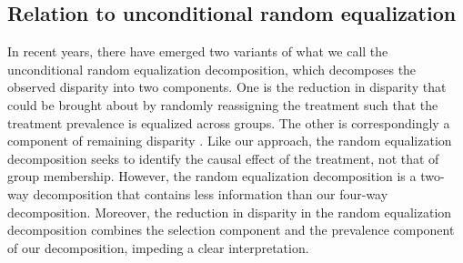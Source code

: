 \documentclass[12pt,a4paper]{article}
\begin{document}
\subsection{Relation to unconditional random equalization}
In recent years, there have emerged two variants of what we call the unconditional random equalization decomposition, which decomposes the observed disparity into two components. One is the reduction in disparity that could be brought about by randomly reassigning the treatment such that the treatment prevalence is equalized across groups. The other is correspondingly a component of remaining disparity \citep{vanderweele_causal_2014, jackson_decomposition_2018, sudharsanan_educational_2021, lundberg_gap-closing_2022,park_sensitivity_2023}. Like our approach, the random equalization decomposition seeks to identify the causal effect of the treatment, not that of group membership. However, the random equalization decomposition is a two-way decomposition that contains less information than our four-way decomposition. Moreover, the reduction in disparity in the random equalization decomposition combines the selection component and the prevalence component of our decomposition, impeding a clear interpretation.

\end{document}
